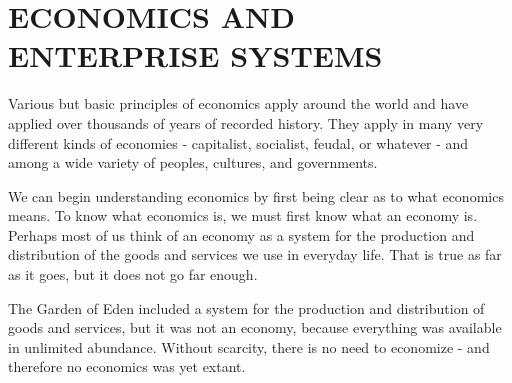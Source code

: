 \chapter{ECONOMICS AND ENTERPRISE SYSTEMS}\label{chap:04}

Various but basic principles of economics apply around the world and have applied over thousands of years of recorded history. They apply in many very different kinds of economies - capitalist, socialist, feudal, or whatever - and among a wide variety of peoples, cultures, and governments. 

We can begin understanding economics by first being clear as to what economics means. To know what economics is, we must first know what an economy is. Perhaps most of us think of an economy as a system for the production and distribution of the goods and services we use in everyday life. That is true as far as it goes, but it does not go far enough.

The Garden of Eden included a system for the production and distribution of goods and services, but it was not an economy, because everything was available in unlimited abundance. Without scarcity, there is no need to economize - and therefore no economics was yet extant.








